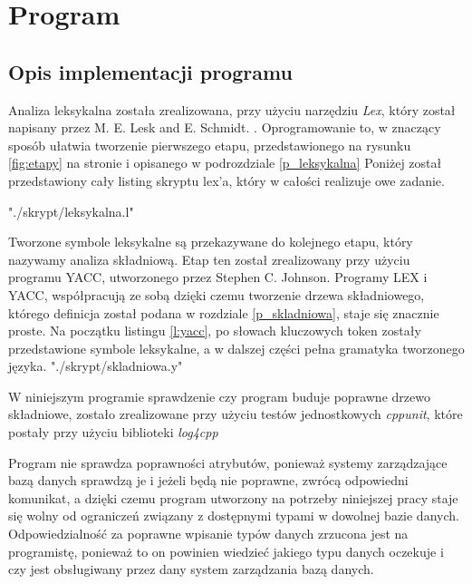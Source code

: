 \chapter{Program}

\section{Opis implementacji programu}



Analiza leksykalna została zrealizowana, 
  przy użyciu narzędziu \textit{Lex},
  który został napisany  przez M. E. Lesk and E. Schmidt. \cite{link_lex}.
Oprogramowanie to, w znaczący sposób ułatwia tworzenie pierwszego etapu,
 przedstawionego na rysunku \ref{fig:etapy} na stronie \pageref{fig:etapy} 
 i opisanego  w podrozdziale \ref{p_leksykalna}
Poniżej został przedstawiony cały listing skryptu lex'a,
 który w całości realizuje owe zadanie.

 {"./skrypt/leksykalna.l"}


Tworzone symbole leksykalne są przekazywane do kolejnego etapu,
 który nazywamy analiza składniową. 
Etap ten został zrealizowany przy użyciu programu YACC,
 utworzonego przez Stephen C. Johnson.
Programy LEX i YACC, współpracują ze sobą dzięki czemu tworzenie drzewa składniowego,
 którego definicja został podana w rozdziale \ref{p_skladniowa}, 
 staje się znacznie proste.
Na początku listingu  \ref{l:yacc},
 po słowach kluczowych token zostały przedstawione symbole leksykalne,
a w dalszej części pełna gramatyka tworzonego języka.
 {"./skrypt/skladniowa.y"}  


W niniejszym programie sprawdzenie czy program buduje poprawne drzewo składniowe,
 zostało zrealizowane przy użyciu testów jednostkowych \textit{cppunit}, 
 które postały przy użyciu biblioteki \textit{log4cpp}

Program nie sprawdza poprawności atrybutów, ponieważ systemy zarządzające bazą danych sprawdzą je 
 i jeżeli będą nie poprawne,
 zwrócą odpowiedni komunikat,
 a dzięki czemu program utworzony na potrzeby niniejszej pracy staje się wolny od ograniczeń związany 
 z dostępnymi typami w dowolnej bazie danych.
Odpowiedzialność za poprawne wpisanie typów danych 
 zrzucona jest na programistę,
 ponieważ to on powinien wiedzieć jakiego typu danych oczekuje 
 i czy jest obsługiwany przez dany system zarządzania bazą danych.


